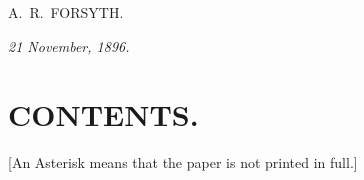 \documentclass[11pt,a4paper]{book}
\begin{document}
\begin{flushright}
A.~R.~FORSYTH.
\end{flushright}

\begin{flushleft}
\textit{21 November, 1896.}
\end{flushleft}

\cleardoublepage

\chapter*{CONTENTS.}

\begin{center}
\small [An Asterisk means that the paper is not printed in full.]
\end{center}
\end{document}
